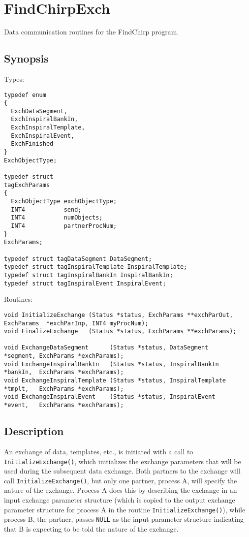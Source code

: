 \documentclass{article}
\begin{document}
\section{FindChirpExch}

Data communication routines for the FindChirp program.

\subsection{Synopsis}

Types:
\begin{verbatim}
typedef enum
{
  ExchDataSegment,
  ExchInspiralBankIn,
  ExchInspiralTemplate,
  ExchInspiralEvent,
  ExchFinished
}
ExchObjectType;

typedef struct
tagExchParams
{
  ExchObjectType exchObjectType;
  INT4           send;
  INT4           numObjects;
  INT4           partnerProcNum;
}
ExchParams;

typedef struct tagDataSegment DataSegment;
typedef struct tagInspiralTemplate InspiralTemplate;
typedef struct tagInspiralBankIn InspiralBankIn;
typedef struct tagInspiralEvent InspiralEvent;
\end{verbatim}

Routines:
\begin{verbatim}
void InitializeExchange (Status *status, ExchParams **exchParOut, ExchParams  *exchParInp, INT4 myProcNum);
void FinalizeExchange   (Status *status, ExchParams **exchParams);

void ExchangeDataSegment      (Status *status, DataSegment      *segment, ExchParams *exchParams);
void ExchangeInspiralBankIn   (Status *status, InspiralBankIn   *bankIn,  ExchParams *exchParams);
void ExchangeInspiralTemplate (Status *status, InspiralTemplate *tmplt,   ExchParams *exchParams);
void ExchangeInspiralEvent    (Status *status, InspiralEvent    *event,   ExchParams *exchParams);
\end{verbatim}

\subsection{Description}

An exchange of data, templates, etc., is initiated with a call to
\verb+InitializeExchange()+, which initializes the exchange parameters that
will be used during the subsequent data exchange.  Both partners to the
exchange will call \verb+InitializeExchange()+, but only one partner, process
A, will specify the nature of the exchange.  Process A does this by describing
the exchange in an input exchange parameter structure (which is copied to the
output exchange parameter structure for process A in the routine
\verb+InitializeExchange()+), while process B, the partner, passes \verb+NULL+
as the input parameter structure indicating that B is expecting to be told the
nature of the exchange.
\end{document}
